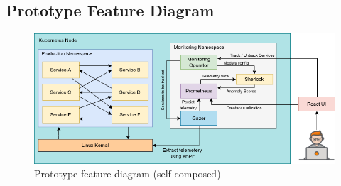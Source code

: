 \subsection{Prototype Feature Diagram}
\begin{figure}[H]
    \centering
    \includegraphics[width=14.9cm]{assets/introduction/High-level-system-diagram.png}
    \caption{Prototype feature diagram (self composed)}
    \label{fig:high-level-diagram}
\end{figure}